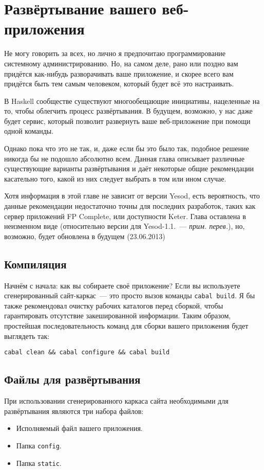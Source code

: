\chapter{Развёртывание вашего веб-приложения}\label{chap:deploying}
Не могу говорить за всех, но лично я предпочитаю программирование системному
администрированию. Но, на самом деле, рано или поздно вам придётся как-нибудь
разворачивать ваше приложение, и скорее всего вам придётся быть тем самым
человеком, который будет всё это настраивать.

В Haskell сообществе существуют многообещающие инициативы, нацеленные на то,
чтобы облегчить процесс развёртывания. В будущем, возможно, у нас даже будет
сервис, который позволит развернуть ваше веб-приложение при помощи одной
команды.

Однако пока что это не так, и, даже если бы это было так, подобное решение
никогда бы не подошло абсолютно всем. Данная глава описывает различные
существующие варианты развёртывания и даёт некоторые общие рекомендации
касательно того, какой из них следует выбрать в том или ином случае.

\begin{remark}
    Хотя информация в этой главе не зависит от версии Yesod, есть вероятность,
    что данные рекомендации недостаточно точны для последних разработок, таких
    как сервер приложений FP Complete, или доступности Keter. Глава оставлена в
    неизменном виде (относительно версии для Yesod-1.1.~--- \emph{прим.
    перев.}), но, возможно, будет обновлена в будущем (23.06.2013)
\end{remark}

\section{Компиляция}
Начнём с начала: как вы собираете своё приложение? Если вы используете
сгенерированный сайт-каркас~--- это просто вызов команды \lstinline{cabal build}.
Я бы также рекомендовал очистку рабочих каталогов перед сборкой, чтобы
гарантировать отсутствие закешированной информации. Таким образом, простейшая
последовательность команд для сборки вашего приложения будет выглядеть так:

\begin{lstlisting}
cabal clean && cabal configure && cabal build
\end{lstlisting}

\section{Файлы для развёртывания}
При использовании сгенерированного каркаса сайта необходимыми для
развёртывания являются три набора файлов:
\begin{itemize}
    \item Исполняемый файл вашего приложения.

    \item Папка \texttt{config}.

    \item Папка \texttt{static}.
\end{itemize}

